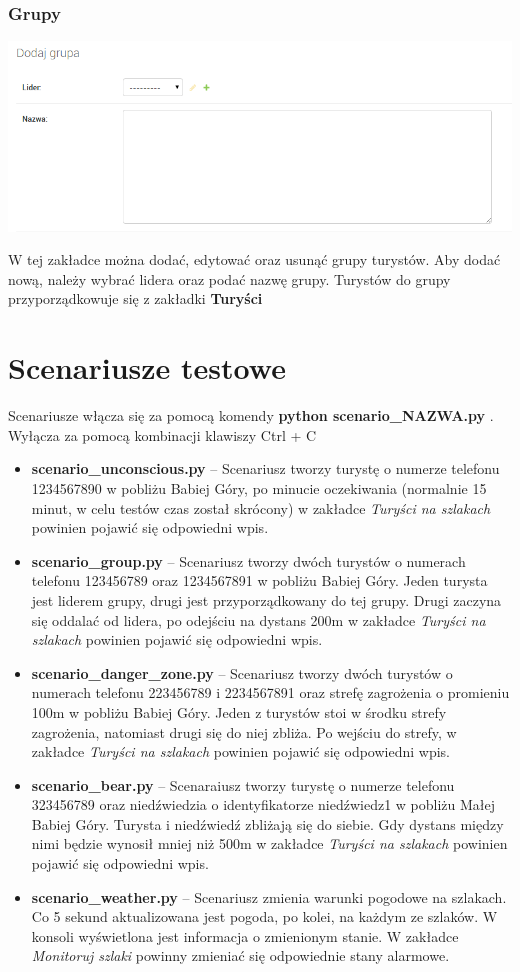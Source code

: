 \documentclass[a4paper,12pt]{article}
\begin{document}
\subsubsection{Grupy}
\begin{center}
\includegraphics[scale=1]{ui7.png}
\end{center}
W tej zakładce można dodać, edytować oraz usunąć grupy turystów. Aby dodać nową, należy wybrać lidera oraz podać nazwę grupy. Turystów do grupy przyporządkowuje się z zakładki \textbf{Turyści}
\newpage
\section{Scenariusze testowe}
Scenariusze włącza się za pomocą komendy \textbf{python scenario\_NAZWA.py} . Wyłącza za pomocą kombinacji klawiszy Ctrl + C
\begin{itemize}
\item \textbf{scenario\_unconscious.py} -- Scenariusz tworzy turystę o numerze telefonu 1234567890 w pobliżu Babiej Góry, po minucie oczekiwania (normalnie 15 minut, w celu testów czas został skrócony) w zakładce \textit{Turyści na szlakach} powinien pojawić się odpowiedni wpis.
\item \textbf{scenario\_group.py} -- Scenariusz tworzy dwóch turystów o numerach telefonu 123456789 oraz 1234567891 w pobliżu Babiej Góry. Jeden turysta jest liderem grupy, drugi jest przyporządkowany do tej grupy. Drugi zaczyna się oddalać od lidera, po odejściu na dystans 200m w zakładce \textit{Turyści na szlakach} powinien pojawić się odpowiedni wpis.
\item \textbf{scenario\_danger\_zone.py} -- Scenariusz tworzy dwóch turystów o numerach telefonu 223456789 i 2234567891 oraz strefę zagrożenia o promieniu 100m w pobliżu Babiej Góry. Jeden z turystów stoi w środku strefy zagrożenia, natomiast drugi się do niej zbliża. Po wejściu do strefy, w zakładce \textit{Turyści na szlakach} powinien pojawić się odpowiedni wpis.
\item \textbf{scenario\_bear.py} -- Scenaraiusz tworzy turystę o numerze telefonu 323456789 oraz niedźwiedzia o identyfikatorze niedźwiedz1 w pobliżu Małej Babiej Góry. Turysta i niedźwiedź zbliżają się do siebie. Gdy dystans między nimi będzie wynosił mniej niż 500m w zakładce \textit{Turyści na szlakach} powinien pojawić się odpowiedni wpis.
\item \textbf{scenario\_weather.py} -- Scenariusz zmienia warunki pogodowe na szlakach. Co 5 sekund aktualizowana jest pogoda, po kolei, na każdym ze szlaków. W konsoli wyświetlona jest informacja o zmienionym stanie. W zakładce \textit{Monitoruj szlaki} powinny zmieniać się odpowiednie stany alarmowe.
\end{itemize}
\newpage
\end{document}

